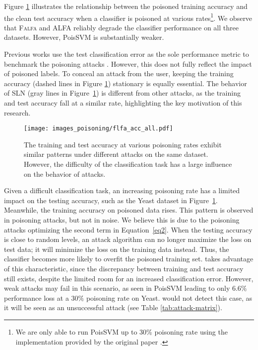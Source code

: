\documentclass[runningheads]{llncs}
\newcommand{\falfa}{\textsc{Falfa}\xspace}
\begin{document}
Figure \ref{fig.real_acc} illustrates the relationship between the poisoned training accuracy and the clean test accuracy when a classifier is poisoned at various rates\footnote{We are only able to run PoisSVM up to 30\% poisoning rate using the implementation provided by the original paper \cite{biggio2012poisoning}.}.
We observe that \falfa and ALFA reliably degrade the classifier performance on all three datasets. However, PoisSVM is substantially weaker.

Previous works use the test classification error as the sole performance metric to benchmark the poisoning attacks \cite{ho2002complexity,koh2022stronger,paudice2018label}.
However, this does not fully reflect the impact of poisoned labels.
To conceal an attack from the user, keeping the training accuracy (dashed lines in Figure \ref{fig.real_acc}) stationary is equally essential.
The behavior of SLN (gray lines in Figure~\ref{fig.real_acc}) is different from other attacks, as the training and test accuracy fall at a similar rate, highlighting the key motivation of this research.

\begin{figure}[ht!]
    \centering
    \texttt{[image: images\_poisoning/flfa\_acc\_all.pdf]}
    \caption[Training and Test Accuracy Under Poisoning Attacks]{
        The training and test accuracy at various poisoning rates exhibit similar patterns under different attacks on the same dataset. However, the difficulty of the classification task has a large influence on the behavior of attacks.
    }
    \label{fig.real_acc}
\end{figure}

Given a difficult classification task,
an increasing poisoning rate has a limited impact on the testing accuracy, such as the Yeast dataset in Figure~\ref{fig.real_acc}.
Meanwhile, the training accuracy on poisoned data rises.
This pattern is observed in poisoning attacks, but not in noise.
We believe this is due to the poisoning attacks optimizing the second term in Equation~\ref{eq2}.
When the testing accuracy is close to random levels, an attack algorithm can no longer maximize the loss on test data; it will minimize the loss on the training data instead.
Thus, the classifier becomes more likely to overfit the poisoned training set.
\diva takes advantage of this characteristic, since the discrepancy between training and test accuracy still exists, despite the limited room for an increased classification error.
However, weak attacks may fail in this scenario, as seen in PoisSVM leading to only $6.6\%$ performance loss at a $30\%$ poisoning rate on Yeast. \diva would not detect this case, as it will be seen as an unsuccessful attack (see Table \ref{tab:attack-matrix}).
\end{document}
